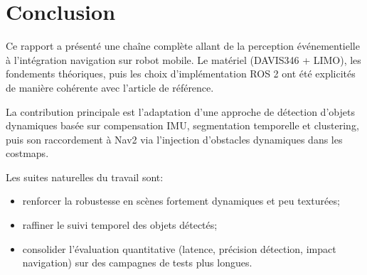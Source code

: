 \chapter*{Conclusion}

Ce rapport a présenté une chaîne complète allant de la perception événementielle
à l'intégration navigation sur robot mobile. Le matériel (DAVIS346 + LIMO), les
fondements théoriques, puis les choix d'implémentation ROS 2 ont été explicités
de manière cohérente avec l'article de référence.

La contribution principale est l'adaptation d'une approche de détection d'objets
dynamiques basée sur compensation IMU, segmentation temporelle et clustering,
puis son raccordement à Nav2 via l'injection d'obstacles dynamiques dans les
costmaps.

Les suites naturelles du travail sont:
\begin{itemize}
\item renforcer la robustesse en scènes fortement dynamiques et peu texturées;
\item raffiner le suivi temporel des objets détectés;
\item consolider l'évaluation quantitative (latence, précision détection,
impact navigation) sur des campagnes de tests plus longues.
\end{itemize}
